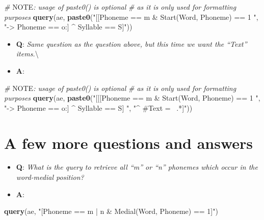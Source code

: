 \documentclass[]{book}
\newenvironment{Shaded}{\begin{snugshade}}{\end{snugshade}}
\newcommand{\AlertTok}[1]{\textcolor[rgb]{0.94,0.16,0.16}{#1}}
\newcommand{\CommentTok}[1]{\textcolor[rgb]{0.56,0.35,0.01}{\textit{#1}}}
\newcommand{\KeywordTok}[1]{\textcolor[rgb]{0.13,0.29,0.53}{\textbf{#1}}}
\newcommand{\NormalTok}[1]{#1}
\newcommand{\StringTok}[1]{\textcolor[rgb]{0.31,0.60,0.02}{#1}}
\providecommand{\tightlist}{%
  \setlength{\itemsep}{0pt}\setlength{\parskip}{0pt}}
\begin{document}
\begin{Shaded}
\begin{Highlighting}[]
\CommentTok{# }\AlertTok{NOTE}\CommentTok{: usage of paste0() is optional}
\CommentTok{# as it is only used for formatting purposes}
\KeywordTok{query}\NormalTok{(ae, }\KeywordTok{paste0}\NormalTok{(}\StringTok{"[[Phoneme == m & Start(Word, Phoneme) == 1 "}\NormalTok{,}
                 \StringTok{"-> Phoneme == o:] ^ Syllable == S]"}\NormalTok{))}
\end{Highlighting}
\end{Shaded}

\begin{itemize}
\tightlist
\item
  \textbf{Q}: \emph{Same question as the question above, but this time we want the ``Text'' items.}\textbackslash{}
\item
  \textbf{A}:
\end{itemize}

\begin{Shaded}
\begin{Highlighting}[]
\CommentTok{# }\AlertTok{NOTE}\CommentTok{: usage of paste0() is optional}
\CommentTok{# as it is only used for formatting purposes}
\KeywordTok{query}\NormalTok{(ae, }\KeywordTok{paste0}\NormalTok{(}\StringTok{"[[[Phoneme == m & Start(Word, Phoneme) == 1 "}\NormalTok{,}
                 \StringTok{"-> Phoneme == o:] ^ Syllable == S] "}\NormalTok{,}
                 \StringTok{"^ #Text =~ .*]"}\NormalTok{))}
\end{Highlighting}
\end{Shaded}

\hypertarget{a-few-more-questions-and-answers}{%
\section{A few more questions and answers}\label{a-few-more-questions-and-answers}}

\begin{itemize}
\tightlist
\item
  \textbf{Q}: \emph{What is the query to retrieve all ``m'' or ``n'' phonemes which occur in the word-medial position?}
\item
  \textbf{A}:
\end{itemize}

\begin{Shaded}
\begin{Highlighting}[]
\KeywordTok{query}\NormalTok{(ae, }\StringTok{"[Phoneme == m | n & Medial(Word, Phoneme) == 1]"}\NormalTok{)}
\end{Highlighting}
\end{Shaded}
\end{document}

